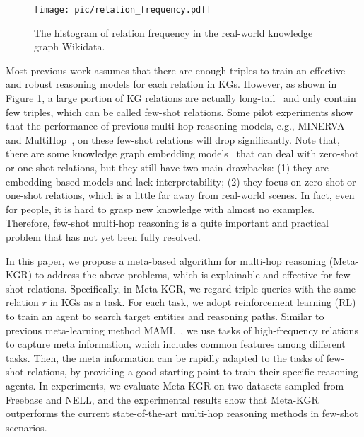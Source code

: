 \documentclass[11pt,a4paper]{article}
\begin{document}
\begin{figure}[t]
\centering
\setlength{\abovecaptionskip}{2pt}
\setlength{\belowcaptionskip}{0pt}
\texttt{[image: pic/relation\_frequency.pdf]}
\caption{The histogram of relation frequency in the real-world knowledge graph Wikidata.}
\label{relation_frequency}
\end{figure}

Most previous work assumes that there are enough triples to train an effective and robust reasoning models for each relation in KGs. However, as shown in Figure \ref{relation_frequency}, a large portion of KG relations are actually long-tail~\cite{one-shot,Fewrel} and only contain few triples, which can be called few-shot relations. Some pilot experiments show that the performance of previous multi-hop reasoning models, e.g., MINERVA~\cite{MINERVA} and MultiHop~\cite{MultiHop}, on these few-shot relations will drop significantly. Note that, there are some knowledge graph embedding models~\cite{one-shot, shi2018open, DKRL} that can deal with zero-shot or one-shot relations, but they still have two main drawbacks: (1) they are embedding-based models and lack interpretability; (2) they focus on zero-shot or one-shot relations, which is a little far away from real-world scenes. In fact, even for people, it is hard to grasp new knowledge with almost no examples. Therefore, few-shot multi-hop reasoning is a quite important and practical problem that has not yet been fully resolved.

In this paper, we propose a meta-based algorithm for multi-hop reasoning (Meta-KGR) to address the above problems, which is explainable and effective for few-shot relations. Specifically, in Meta-KGR, we regard triple queries with the same relation $r$ in KGs as a task. For each task, we adopt reinforcement learning (RL) to train an agent to search target entities and reasoning paths. Similar to previous meta-learning method MAML~\cite{MAML}, we use tasks of high-frequency relations to capture meta information, which includes common features among different tasks. Then, the meta information can be rapidly adapted to the tasks of few-shot relations, by providing a good starting point to train their specific reasoning agents. In experiments, we evaluate Meta-KGR on two datasets sampled from Freebase and NELL, and the experimental results show that Meta-KGR outperforms  the current state-of-the-art multi-hop reasoning methods in few-shot scenarios.  
\end{document}
